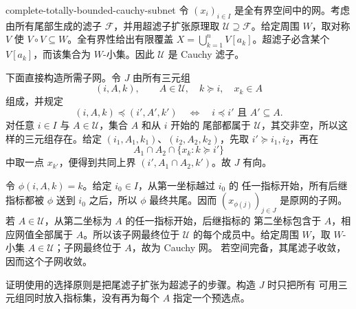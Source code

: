 \begin{solution}{complete-totally-bounded-cauchy-subnet}
令 \((x_i)_{i\in I}\) 是全有界空间中的网。考虑由所有尾部生成的滤子
\(\mathcal F\)，并用超滤子扩张原理取
\(\mathcal U\supseteq\mathcal F\)。给定周围 \(W\)，取对称 \(V\) 使
\(V\circ V\subseteq W\)。全有界性给出有限覆盖
\(X=\bigcup_{k=1}^nV[a_k]\)。超滤子必含某个 \(V[a_k]\)，而该集合为
\(W\)-小集。因此 \(\mathcal U\) 是 Cauchy 滤子。

下面直接构造所需子网。令 \(J\) 由所有三元组
\[
 (i,A,k),\qquad A\in\mathcal U,\quad k\succcurlyeq i,\quad x_k\in A
\]
组成，并规定
\[
 (i,A,k)\preccurlyeq(i',A',k')
 \quad\Longleftrightarrow\quad
 i\preccurlyeq i'\text{ 且 }A'\subseteq A.
\]
对任意 \(i\in I\) 与 \(A\in\mathcal U\)，集合 \(A\) 和从 \(i\) 开始的
尾部都属于 \(\mathcal U\)，其交非空，所以这样的三元组存在。给定
\((i_1,A_1,k_1)\)、\((i_2,A_2,k_2)\)，先取
\(i'\succcurlyeq i_1,i_2\)，再在
\[
 A_1\cap A_2\cap\{x_k:k\succcurlyeq i'\}
\]
中取一点 \(x_{k'}\)，便得到共同上界
\((i',A_1\cap A_2,k')\)。故 \(J\) 有向。

令 \(\phi(i,A,k)=k\)。给定 \(i_0\in I\)，从第一坐标越过 \(i_0\) 的
任一指标开始，所有后继指标都被 \(\phi\) 送到 \(i_0\) 之后，所以
\(\phi\) 最终共尾。因而 \((x_{\phi(j)})_{j\in J}\) 是原网的子网。
若 \(A\in\mathcal U\)，从第二坐标为 \(A\) 的任一指标开始，后继指标的
第二坐标包含于 \(A\)，相应网值全部属于 \(A\)。所以该子网最终位于
\(\mathcal U\) 的每个成员中。给定周围 \(W\)，取
\(W\)-小集 \(A\in\mathcal U\)；子网最终位于 \(A\)，故为 Cauchy 网。
若空间完备，其尾滤子收敛，因而这个子网收敛。

证明使用的选择原则是把尾滤子扩张为超滤子的步骤。构造 \(J\) 时只把所有
可用三元组同时放入指标集，没有再为每个 \(A\) 指定一个预选点。
\end{solution}


